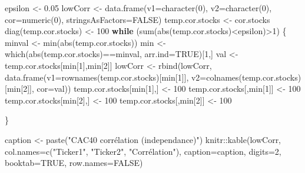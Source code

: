 \documentclass[
]{article}
\newenvironment{Shaded}{\begin{snugshade}}{\end{snugshade}}
\newcommand{\AttributeTok}[1]{\textcolor[rgb]{0.77,0.63,0.00}{#1}}
\newcommand{\ConstantTok}[1]{\textcolor[rgb]{0.00,0.00,0.00}{#1}}
\newcommand{\ControlFlowTok}[1]{\textcolor[rgb]{0.13,0.29,0.53}{\textbf{#1}}}
\newcommand{\DecValTok}[1]{\textcolor[rgb]{0.00,0.00,0.81}{#1}}
\newcommand{\FloatTok}[1]{\textcolor[rgb]{0.00,0.00,0.81}{#1}}
\newcommand{\FunctionTok}[1]{\textcolor[rgb]{0.00,0.00,0.00}{#1}}
\newcommand{\NormalTok}[1]{#1}
\newcommand{\OtherTok}[1]{\textcolor[rgb]{0.56,0.35,0.01}{#1}}
\newcommand{\SpecialCharTok}[1]{\textcolor[rgb]{0.00,0.00,0.00}{#1}}
\newcommand{\StringTok}[1]{\textcolor[rgb]{0.31,0.60,0.02}{#1}}
\begin{document}
\begin{Shaded}
\begin{Highlighting}[]
\NormalTok{epsilon }\OtherTok{\textless{}{-}} \FloatTok{0.05}
\NormalTok{lowCorr }\OtherTok{\textless{}{-}} \FunctionTok{data.frame}\NormalTok{(}\AttributeTok{v1=}\FunctionTok{character}\NormalTok{(}\DecValTok{0}\NormalTok{), }\AttributeTok{v2=}\FunctionTok{character}\NormalTok{(}\DecValTok{0}\NormalTok{), }\AttributeTok{cor=}\FunctionTok{numeric}\NormalTok{(}\DecValTok{0}\NormalTok{), }
                      \AttributeTok{stringsAsFactors=}\ConstantTok{FALSE}\NormalTok{)}
\NormalTok{temp.cor.stocks }\OtherTok{\textless{}{-}}\NormalTok{ cor.stocks}
\FunctionTok{diag}\NormalTok{(temp.cor.stocks) }\OtherTok{\textless{}{-}} \DecValTok{100}
\ControlFlowTok{while}\NormalTok{ (}\FunctionTok{sum}\NormalTok{(}\FunctionTok{abs}\NormalTok{(temp.cor.stocks)}\SpecialCharTok{\textless{}}\NormalTok{epsilon)}\SpecialCharTok{\textgreater{}}\DecValTok{1}\NormalTok{) \{}
\NormalTok{  minval }\OtherTok{\textless{}{-}} \FunctionTok{min}\NormalTok{(}\FunctionTok{abs}\NormalTok{(temp.cor.stocks))}
\NormalTok{  min }\OtherTok{\textless{}{-}} \FunctionTok{which}\NormalTok{(}\FunctionTok{abs}\NormalTok{(temp.cor.stocks)}\SpecialCharTok{==}\NormalTok{minval, }\AttributeTok{arr.ind=}\ConstantTok{TRUE}\NormalTok{)[}\DecValTok{1}\NormalTok{,]}
\NormalTok{  val }\OtherTok{\textless{}{-}}\NormalTok{ temp.cor.stocks[min[}\DecValTok{1}\NormalTok{],min[}\DecValTok{2}\NormalTok{]]}
\NormalTok{  lowCorr }\OtherTok{\textless{}{-}} \FunctionTok{rbind}\NormalTok{(lowCorr, }\FunctionTok{data.frame}\NormalTok{(}\AttributeTok{v1=}\FunctionTok{rownames}\NormalTok{(temp.cor.stocks)[min[}\DecValTok{1}\NormalTok{]], }
                                       \AttributeTok{v2=}\FunctionTok{colnames}\NormalTok{(temp.cor.stocks)[min[}\DecValTok{2}\NormalTok{]], }
                                       \AttributeTok{cor=}\NormalTok{val))}
\NormalTok{  temp.cor.stocks[min[}\DecValTok{1}\NormalTok{],] }\OtherTok{\textless{}{-}} \DecValTok{100}
\NormalTok{  temp.cor.stocks[,min[}\DecValTok{1}\NormalTok{]] }\OtherTok{\textless{}{-}} \DecValTok{100}
\NormalTok{  temp.cor.stocks[min[}\DecValTok{2}\NormalTok{],] }\OtherTok{\textless{}{-}} \DecValTok{100}
\NormalTok{  temp.cor.stocks[,min[}\DecValTok{2}\NormalTok{]] }\OtherTok{\textless{}{-}} \DecValTok{100}

\NormalTok{\}}

\NormalTok{caption }\OtherTok{\textless{}{-}} \FunctionTok{paste}\NormalTok{(}\StringTok{"CAC40 corrélation (independance)"}\NormalTok{)}
\NormalTok{knitr}\SpecialCharTok{::}\FunctionTok{kable}\NormalTok{(lowCorr,}
             \AttributeTok{col.names=}\FunctionTok{c}\NormalTok{(}\StringTok{"Ticker1"}\NormalTok{, }\StringTok{"Ticker2"}\NormalTok{, }\StringTok{"Corrélation"}\NormalTok{), }
             \AttributeTok{caption=}\NormalTok{caption,}
             \AttributeTok{digits=}\DecValTok{2}\NormalTok{, }\AttributeTok{booktab=}\ConstantTok{TRUE}\NormalTok{, }\AttributeTok{row.names=}\ConstantTok{FALSE}\NormalTok{)}
\end{Highlighting}
\end{Shaded}
\end{document}
